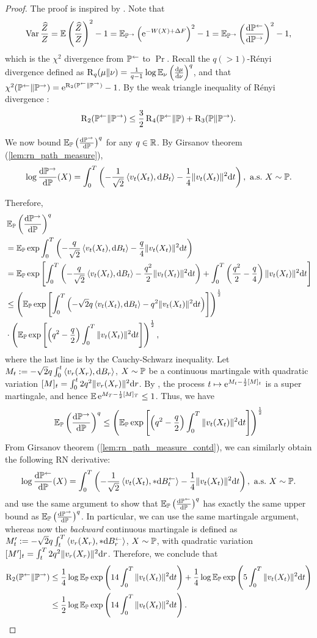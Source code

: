 \begin{proof}
The proof is inspired by \cite{chewi2022analysis}. Note that
$$\var\frac{\Zh}{Z}=\E\ro{\frac{\Zh}{Z}}^2-1=\E_{\Pr}\ro{\e^{-W(X)+\Delta F}}^2-1=\E_{\Pr}\ro{\de{\Pl}{\Pr}}^2-1,$$
which is the $\chi^2$ divergence from $\Pl$ to $\Pr$. Recall the $q(>1)$-R\'enyi divergence defined as $\renyi_q(\mu\|\nu)=\frac{1}{q-1}\log\E_\nu\ro{\de{\mu}{\nu}}^q$, and that $\chi^2(\Pl\|\Pr)=\e^{\renyi_2(\Pl\|\Pr)}-1$. By the weak triangle inequality of R\'enyi divergence \cite[Lem. 6.2.5]{chewi2022log}: 
$$\renyi_2(\Pl\|\Pr)\le\frac{3}{2}\renyi_4(\Pl\|\P)+\renyi_3(\P\|\Pr).$$

We now bound $\E_\P\ro{\de{\Pr}{\P}}^q$ for any $q\in\R$. By Girsanov theorem (\cref{lem:rn_path_measure}),
$$\log\de{\Pr}{\P}(X)=\int_0^T\ro{-\frac{1}{\sqrt{2}}\inn{v_t(X_t),\d B_t}-\frac{1}{4}\|v_t(X_t)\|^2\d t},~\text{a.s.}~X\sim\P.$$

Therefore,
\begin{align*}
    &\E_\P\ro{\de{\Pr}{\P}}^q\\
    &=\E_\P\exp\int_0^T\ro{-\frac{q}{\sqrt{2}}\inn{v_t(X_t),\d B_t}-\frac{q}{4}\|v_t(X_t)\|^2\d t}\\
    &=\E_\P\exp\sq{\int_0^T\ro{-\frac{q}{\sqrt{2}}\inn{v_t(X_t),\d B_t}-\frac{q^2}{2}\|v_t(X_t)\|^2\d t}+\int_0^T\ro{\frac{q^2}{2}-\frac{q}{4}}\|v_t(X_t)\|^2\d t}\\
    &\le\ro{\E_\P\exp\sq{\int_0^T\ro{-\sqrt{2}q\inn{v_t(X_t),\d B_t}-q^2\|v_t(X_t)\|^2\d t}}}^\frac12\\
    &\cdot\ro{\E_\P\exp\sq{\ro{q^2-\frac{q}{2}}\int_0^T\|v_t(X_t)\|^2\d t}}^\frac12,
\end{align*}
where the last line is by the Cauchy-Schwarz inequality. Let $M_t:=-\sqrt{2}q\int_0^t\inn{v_r(X_r),\d B_r}$, $X\sim\P$ be a continuous martingale with quadratic variation $[M]_t=\int_0^t2q^2\|v_r(X_r)\|^2\d r$. By \citet[Chap. 3.5.D]{karatzas1991brownian}, the process $t\mapsto\e^{M_t-\frac{1}{2}[M]_t}$ is a super martingale, and hence $\E\e^{M_T-\frac{1}{2}[M]_T}\le1$. Thus, we have 
$$\E_\P\ro{\de{\Pr}{\P}}^q\le\ro{\E_\P\exp\sq{\ro{q^2-\frac{q}{2}}\int_0^T\|v_t(X_t)\|^2\d t}}^\frac12$$
From Girsanov theorem (\cref{lem:rn_path_measure_contd}), we can similarly obtain the following RN derivative:
$$\log\de{\Pl}{\P}(X)=\int_0^T\ro{-\frac{1}{\sqrt{2}}\inn{v_t(X_t),*\d\Bl_t}-\frac{1}{4}\|v_t(X_t)\|^2\d t},~\text{a.s.}~X\sim\P.$$
and use the same argument to show that $\E_\P\ro{\de{\Pl}{\P}}^q$ has exactly the same upper bound as $\E_\P\ro{\de{\Pr}{\P}}^q$. In particular, we can use the same martingale argument, whereas now the \emph{backward} continuous martingale is defined as $M'_t:=-\sqrt{2}q\int_t^T\inn{v_r(X_r),*\d\Bl_r}$, $X\sim\P$, with quadratic variation $[M']_t=\int_t^T2q^2\|v_r(X_r)\|^2\d r$. Therefore, we conclude that
\begin{align*}
    \renyi_2(\Pl\|\Pr)&\le\frac{1}{4}\log\E_\P\exp\ro{14\int_0^T\|v_t(X_t)\|^2\d t}+\frac{1}{4}\log\E_\P\exp\ro{5\int_0^T\|v_t(X_t)\|^2\d t}\\
    &\le\frac{1}{2}\log\E_\P\exp\ro{14\int_0^T\|v_t(X_t)\|^2\d t}.
\end{align*}
\end{proof}